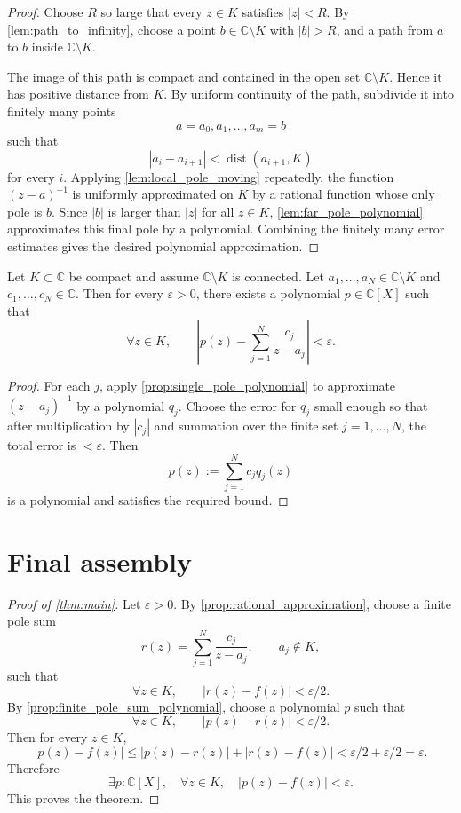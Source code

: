 \documentclass[a4paper]{article}
\newcommand{\C}{\mathbb{C}}
\newcommand{\eps}{\varepsilon}
\newcommand{\dist}{\operatorname{dist}}
\begin{document}
\begin{proof}
Choose \(R\) so large that every \(z \in K\) satisfies \(|z| < R\). By
\cref{lem:path_to_infinity}, choose a point \(b \in \C \setminus K\) with
\(|b|>R\), and a path from \(a\) to \(b\) inside \(\C \setminus K\).

The image of this path is compact and contained in the open set
\(\C \setminus K\). Hence it has positive distance from \(K\). By uniform
continuity of the path, subdivide it into finitely many points
\[
  a=a_0,a_1,\dots,a_m=b
\]
such that
\[
  |a_i-a_{i+1}| < \dist(a_{i+1},K)
\]
for every \(i\). Applying \cref{lem:local_pole_moving} repeatedly, the function
\((z-a)^{-1}\) is uniformly approximated on \(K\) by a rational function whose
only pole is \(b\). Since \(|b|\) is larger than \(|z|\) for all \(z \in K\),
\cref{lem:far_pole_polynomial} approximates this final pole by a polynomial.
Combining the finitely many error estimates gives the desired polynomial
approximation.
\end{proof}

\begin{proposition}
\label{prop:finite_pole_sum_polynomial}
Let \(K \subset \C\) be compact and assume \(\C \setminus K\) is connected. Let
\(a_1,\dots,a_N \in \C \setminus K\) and \(c_1,\dots,c_N \in \C\). Then for
every \(\eps > 0\), there exists a polynomial \(p \in \C[X]\) such that
\[
  \forall z \in K,\qquad
  \left|
    p(z) -
    \sum_{j=1}^N \frac{c_j}{z-a_j}
  \right|
  < \eps .
\]
\end{proposition}

\begin{proof}
For each \(j\), apply \cref{prop:single_pole_polynomial} to approximate
\((z-a_j)^{-1}\) by a polynomial \(q_j\). Choose the error for \(q_j\) small
enough so that after multiplication by \(|c_j|\) and summation over the finite
set \(j=1,\dots,N\), the total error is \(<\eps\). Then
\[
  p(z) := \sum_{j=1}^N c_j q_j(z)
\]
is a polynomial and satisfies the required bound.
\end{proof}

\section{Final assembly}

\begin{proof}[Proof of \cref{thm:main}]
Let \(\eps > 0\). By \cref{prop:rational_approximation}, choose a finite pole
sum
\[
  r(z) = \sum_{j=1}^N \frac{c_j}{z-a_j},
  \qquad a_j \notin K,
\]
such that
\[
  \forall z \in K,\qquad |r(z)-f(z)| < \eps/2 .
\]
By \cref{prop:finite_pole_sum_polynomial}, choose a polynomial \(p\) such that
\[
  \forall z \in K,\qquad |p(z)-r(z)| < \eps/2 .
\]
Then for every \(z \in K\),
\[
  |p(z)-f(z)|
  \le |p(z)-r(z)| + |r(z)-f(z)|
  < \eps/2+\eps/2
  = \eps .
\]
Therefore
\[
  \exists p : \C[X],\quad
  \forall z \in K,\quad |p(z)-f(z)| < \eps .
\]
This proves the theorem.
\end{proof}
\end{document}
